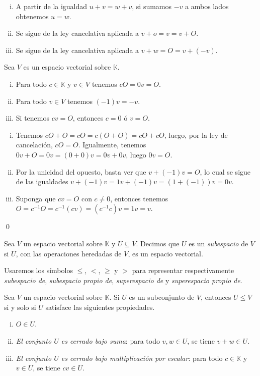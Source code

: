 \dem
\begin{enumerate}[(i)]
  \item A partir de la igualdad $u+v=w+v$, si sumamos $-v$ a ambos lados obtenemos $u=w$.
  \item Se sigue de la ley cancelativa aplicada a $v+o=v=v+O$.
  \item Se sigue de la ley cancelativa aplicada a $v+w=O=v+(-v)$.
\end{enumerate}

\begin{pro}
Sea $V$ es un espacio vectorial sobre $\mathbb{K}$.
\begin{enumerate}[(i)]
\item Para todo $c\in \mathbb{K}$ y $v\in V$ tenemos $cO=0v=O$.
\item Para todo $v\in V$ tenemos $(-1)v=-v$.
\item Si tenemos $cv=O$, entonces $c=0$ \'o $v=O$.
\end{enumerate}
\end{pro}

\dem
\begin{enumerate}[(i)]
\item Tenemos $cO+O=cO=c(O+O)=cO+cO$, luego, por la ley de cancelaci\'on, $cO=O$. Igualmente, tenemos $0v+O=0v=(0+0)v=0v+0v$, luego $0v=O$.
\item Por la unicidad del opuesto, basta ver que $v+(-1)v=O$, lo cual se sigue de las igualdades $v+(-1)v=1v+(-1)v=\left(1+(-1)\right)v=0v$.
\item Suponga que $cv=O$ con $c\ne 0$, entonces tenemos $O=c^{-1}O=c^{-1}(cv)=(c^{-1}c)v=1v=v$.
\end{enumerate}
\qed

\begin{defn}
Sea $V$ un espacio vectorial sobre $\mathbb{K}$ y $U\subseteq V$. Decimos que $U$ es un \emph{subespacio} de $V$ si $U$, con las operaciones heredadas de $V$, es un espacio vectorial.
\end{defn}

\begin{nota}
Usaremos los s\'imbolos $\le$, $<$, $\ge$ y $>$ para representar respectivamente \emph{subespacio de}, \emph{subespacio propio de}, \emph{superespacio de} y \emph{superespacio propio de}.
\end{nota}

\begin{pro}\label{subespsiysolosi}
Sea $V$ un espacio vectorial sobre $\mathbb{K}$. Si $U$ es un subconjunto de $V$, entonces $U\le V$ si y solo si $U$ satisface las siguientes propiedades.
\begin{enumerate}[(i)]
\item $O\in U$.
\item \emph{El conjunto $U$ es cerrado bajo suma}: para todo $v,w\in U$, se tiene $v+w\in U$.
\item \emph{El conjunto $U$ es cerrado bajo multiplicaci\'on por escalar}: para todo $c\in \mathbb{K}$ y $v\in U$, se tiene $cv\in U$.
\end{enumerate} 
\end{pro}

